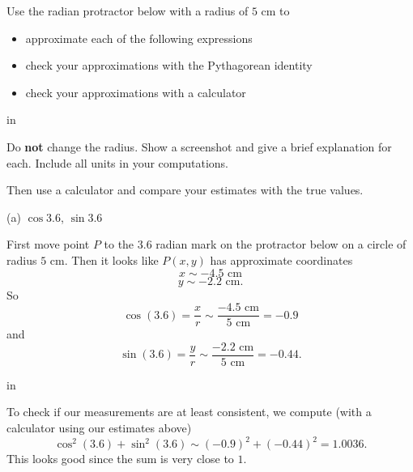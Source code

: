 \documentclass{ximera}
\newcommand{\pskip}{\vskip 0.1 in}
\begin{document}
\begin{question}\label{Exp1:CF}
Use the radian protractor below with a radius of $5$ cm to 
\begin{itemize}

\item{approximate each of the following expressions}

\item{check your approximations with the Pythagorean identity}

\item{check your approximations with a calculator}
\end{itemize}

\pskip

 Do {\bf not} change the radius. Show a screenshot and give a brief explanation for each. Include all units in your computations. 



Then use a calculator and compare your estimates with the true values.

(a) $\cos 3.6$, $\sin 3.6$  %

\begin{explanation}
First move point $P$ to the $3.6$ radian mark on the protractor below on a circle of radius $5$ cm. Then it looks like $P(x,y)$ has approximate coordinates
\[
     x \sim -4.5 \text{ cm}
\]
\[
    y \sim -2.2 \text{ cm} .
\]
So 
\[
   \cos (3.6) = \frac{x}{r} \sim \frac{-4.5 \text{ cm}}{5 \text{ cm}} = -0.9
\]
and 
\[
   \sin (3.6) = \frac{y}{r} \sim \frac{-2.2 \text{ cm}}{5 \text{ cm}} = -0.44 .
\]

 
\begin{onlineOnly}
    \begin{center}
\end{center}
\end{onlineOnly}

\pskip

To check if our measurements are at least consistent, we compute (with a calculator using our estimates above)
\[
   \cos^2 (3.6) + \sin^2 (3.6) \sim (-0.9)^2 + (-0.44)^2  = 1.0036 . 
\]
This looks good since the sum is very close to $1$.


\end{explanation}
\end{question}
\end{document}
